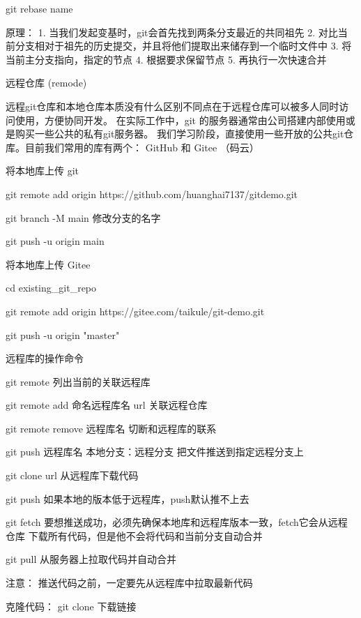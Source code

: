         git rebase name

        原理：
            1. 当我们发起变基时，git会首先找到两条分支最近的共同祖先
            2. 对比当前分支相对于祖先的历史提交，并且将他们提取出来储存到一个临时文件中
            3. 将当前主分支指向，指定的节点
            4. 根据要求保留节点
            5. 再执行一次快速合并

        远程仓库 (remode)

        远程git仓库和本地仓库本质没有什么区别不同点在于远程仓库可以被多人同时访问使用，方便协同开发。
        在实际工作中，git 的服务器通常由公司搭建内部使用或是购买一些公共的私有git服务器。
        我们学习阶段，直接使用一些开放的公共git仓库。目前我们常用的库有两个： GitHub 和 Gitee （码云）

        将本地库上传 git

        git remote add origin https://github.com/huanghai7137/gitdemo.git

        git branch -M main      修改分支的名字

        git push -u origin main

        将本地库上传 Gitee

        cd existing_git_repo

        git remote add origin https://gitee.com/taikule/git-demo.git
        
        git push -u origin "master"

        远程库的操作命令

        git remote      列出当前的关联远程库

        git remote add 命名远程库名 url   关联远程仓库

        git remote remove 远程库名      切断和远程库的联系

        git push 远程库名 本地分支：远程分支    把文件推送到指定远程分支上

        git clone url   从远程库下载代码

        git push    如果本地的版本低于远程库，push默认推不上去

        git fetch     要想推送成功，必须先确保本地库和远程库版本一致，fetch它会从远程仓库
                      下载所有代码，但是他不会将代码和当前分支自动合并

        git pull        从服务器上拉取代码并自动合并

        注意：  推送代码之前，一定要先从远程库中拉取最新代码

        克隆代码：
            git clone 下载链接

